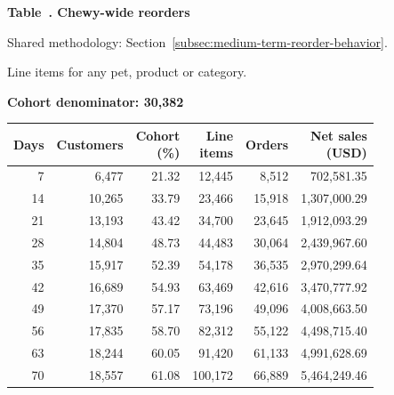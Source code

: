 \label{tab:financial-opportunity-reorder-all-chewy}
\par\smallskip\noindent\parbox[t][2\baselineskip][t]{\linewidth}{\raggedright\textbf{Table~\thetable. Chewy-wide reorders}}
\par\raggedright\footnotesize Shared methodology: Section~\ref{subsec:medium-term-reorder-behavior}.
\par\noindent\parbox[t][2\baselineskip][t]{\linewidth}{\raggedright Line items for any pet, product or category.}
\par\noindent\textbf{Cohort denominator: 30,382}
\par\centering\footnotesize
\setlength{\tabcolsep}{2pt}
\begin{tabular}{rrrrrr}\toprule
Days & Customers & \shortstack{Cohort\\(\%)} & \shortstack{Line\\items} & Orders & \shortstack{Net sales\\(USD)} \\ \midrule

7 & 6,477 & 21.32 & 12,445 & 8,512 & 702,581.35 \\

14 & 10,265 & 33.79 & 23,466 & 15,918 & 1,307,000.29 \\

21 & 13,193 & 43.42 & 34,700 & 23,645 & 1,912,093.29 \\

28 & 14,804 & 48.73 & 44,483 & 30,064 & 2,439,967.60 \\

35 & 15,917 & 52.39 & 54,178 & 36,535 & 2,970,299.64 \\

42 & 16,689 & 54.93 & 63,469 & 42,616 & 3,470,777.92 \\

49 & 17,370 & 57.17 & 73,196 & 49,096 & 4,008,663.50 \\

56 & 17,835 & 58.70 & 82,312 & 55,122 & 4,498,715.40 \\

63 & 18,244 & 60.05 & 91,420 & 61,133 & 4,991,628.69 \\

70 & 18,557 & 61.08 & 100,172 & 66,889 & 5,464,249.46 \\
\bottomrule\end{tabular}\par
